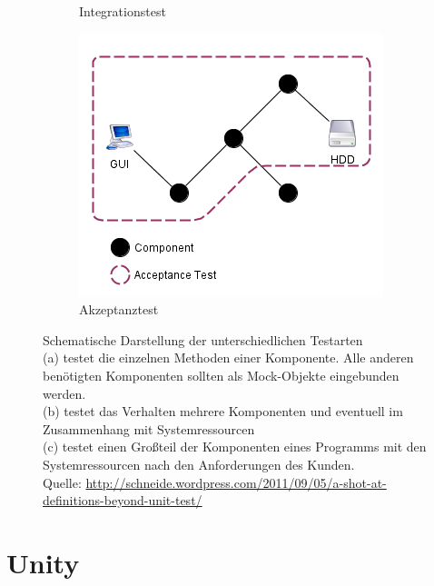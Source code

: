 \begin{figure}[h]
\begin{subfigure}[b]{0.29\textwidth}
	\caption{Integrationstest}
	\label{fig:Integration_Test}
	\end{subfigure}
	\begin{subfigure}[b]{0.39\textwidth}
	\centering
	\captionsetup{justification=centering}
	\includegraphics[width=\textwidth]{./images/Kapitel_Einleitung/Akzeptanz_Test.png}
	\caption{Akzeptanztest}
	\label{fig:Acceptance_Test}
	\end{subfigure}
\caption[Schematische Darstellung der unterschiedlichen Testarten]{Schematische Darstellung der unterschiedlichen Testarten\\(a) testet die einzelnen Methoden einer Komponente. Alle anderen benötigten Komponenten sollten als Mock-Objekte eingebunden werden.\\(b) testet das Verhalten mehrere Komponenten und eventuell im Zusammenhang mit Systemressourcen\\(c) testet einen Großteil der Komponenten eines Programms mit den Systemressourcen nach den Anforderungen des Kunden.\\
Quelle: \url{http://schneide.wordpress.com/2011/09/05/a-shot-at-definitions-beyond-unit-test/}}
\label{fig:UnitIntegrationAcceptanceTest_Comparison}
\end{figure}
\clearpage

\section{Unity}

